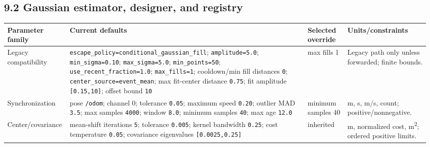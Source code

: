 \documentclass[
  10pt,
  letterpaper,
]{article}
\newcounter{none} %
\begin{document}
\subsection{9.2 Gaussian estimator, designer, and registry}\label{gaussian-estimator-designer-and-registry}

{\def\LTcaptype{none} %
\begin{longtable}[]{@{}
  >{\raggedright\arraybackslash}p{}
  >{\raggedright\arraybackslash}p{}
  >{\raggedright\arraybackslash}p{}
  >{\raggedright\arraybackslash}p{}@{}}
\toprule\noalign{}
\begin{minipage}[b]{\linewidth}\raggedright
Parameter family
\end{minipage} & \begin{minipage}[b]{\linewidth}\raggedright
Current defaults
\end{minipage} & \begin{minipage}[b]{\linewidth}\raggedright
Selected override
\end{minipage} & \begin{minipage}[b]{\linewidth}\raggedright
Units/constraints
\end{minipage} \\
\midrule\noalign{}
\endhead
\bottomrule\noalign{}
\endlastfoot
Legacy compatibility & \nolinkurl{escape\_policy=conditional\_gaussian\_fill}; \nolinkurl{amplitude=5.0}; \nolinkurl{min\_sigma=0.10}; \nolinkurl{max\_sigma=5.0}; \nolinkurl{min\_points=50}; \nolinkurl{use\_recent\_fraction=1.0}; \nolinkurl{max\_fills=1}; cooldown/min fill distances \nolinkurl{0}; \nolinkurl{center\_source=event\_mean}; max fit-center distance \nolinkurl{0.75}; fit amplitude \nolinkurl{[0.15,10]}; offset bound \nolinkurl{10} & max fills 1 & Legacy path only unless forwarded; finite bounds. \\
Synchronization & pose \nolinkurl{/odom}; channel 0; tolerance \nolinkurl{0.05}; maximum speed \nolinkurl{0.20}; outlier MAD \nolinkurl{3.5}; max samples \nolinkurl{4000}; window \nolinkurl{8.0}; minimum samples \nolinkurl{40}; max age \nolinkurl{12.0} & minimum samples 40 & m, s, m/s, count; positive/nonnegative. \\
Center/covariance & mean-shift iterations \nolinkurl{5}; tolerance \nolinkurl{0.005}; kernel bandwidth \nolinkurl{0.25}; cost temperature \nolinkurl{0.05}; covariance eigenvalues \nolinkurl{[0.0025,0.25]} & inherited & m, normalized cost, m\textsuperscript{2}; ordered positive limits. \\

\end{longtable}}
\end{document}

